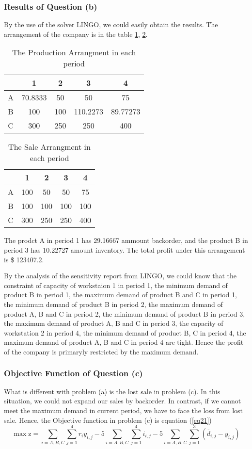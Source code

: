 \documentclass[12pt]{article}
\begin{document}
\subsubsection{Results of Question (b)}
By the use of the solver LINGO, we could easily obtain the results. The arrangement of the company is in the table \ref{tab23}, \ref{tab24}.
	\begin{table}[H]
	\centering
	\setlength{\belowcaptionskip}{0.1cm}
	\caption{The Production Arrangment in each period}
	\label{tab23}
	\begin{tabular}{ccccc}
		\hline
		\hline
		&1&2&3&4\\
		\hline
		A&70.8333&50&50&75\\
		B&100&100&110.2273&89.77273\\
		C&300&250&250&400\\	
		\hline
		\hline
	\end{tabular}
\end{table}
	\begin{table}[H]
	\centering
	\setlength{\belowcaptionskip}{0.1cm}
	\caption{The Sale Arrangment in each period}
	\label{tab24}
	\begin{tabular}{ccccc}
		\hline
		\hline
		&1&2&3&4\\
		\hline
		A&100&50&50&75\\
		B&100&100&100&100\\
		C&300&250&250&400\\	
		\hline
		\hline
	\end{tabular}
\end{table}
\noindent The prodct A in period 1 has  29.16667  ammount backorder, and the product B in period 3 has 10.22727 amount inventory. The total profit under this arrangement is \$ 123407.2.

\noindent By the analysis of the sensitivity report from LINGO, we could know that the constraint of capacity of workstaion 1 in period 1, the minimum demand of product B in period 1, the maximum demand of product B and C in period 1, the minimum demand of product B in period 2, the maximum demand of product A, B and C in period 2, the minimum demand of product B in period 3, the maximum demand of product A, B and C in period 3, the capacity of workstation 2 in period 4,  the minimum demand of product B, C in period 4, the maximum demand of product A, B and C in period 4 are tight. Hence the profit of the company is primaryly restricted by the maximum demand.

\subsubsection{Objective Function of Question (c)}
What is different with problem (a) is the lost sale in problem (c). In this situation, we could not expand our sales by backorder. In contrast, if we cannot meet the maximum demand in current period, we have to face the loss from lost sale. Hence, the Objective function in problem (c) is equation (\ref{eq21})
\begin{equation}
\label{eq21}
	\max \mathrm{z} = \sum\limits_{i=A,B,C}\sum\limits_{j=1}^4r_iy_{i,j}-5\sum\limits_{i=A,B,C}\sum\limits_{j=1}^4i_{i,j}-5\sum\limits_{i=A,B,C}\sum\limits_{j=1}^3(\overline{d}_{i,j}-y_{i,j})
\end{equation}
\end{document}
